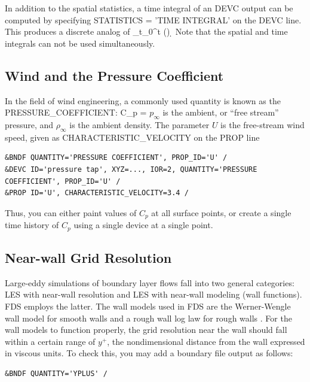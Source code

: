 \documentclass[11pt]{book}
\begin{document}
In addition to the spatial statistics, a time integral of an {\ct DEVC} output can be computed by specifying
{\ct STATISTICS = 'TIME INTEGRAL'} on the {\ct DEVC} line. This produces a discrete analog of
\be
 \int_{t_0}^t \phi(\tau) \; \d \tau
\ee
Note that the spatial and time integrals can not be used simultaneously.



\subsection{Wind and the Pressure Coefficient}
\label{info:wind}

In the field of wind engineering, a commonly used quantity is known as
the {\ct PRESSURE\_COEFFICIENT}:
\be
   C_p = 
\ee
$p_\infty$ is the ambient, or ``free stream'' pressure, and
$\rho_\infty$ is the ambient density.  The parameter $U$ is the
free-stream wind speed, given as {\ct CHARACTERISTIC\_VELOCITY} on the
{\ct PROP} line

\begin{lstlisting}
&BNDF QUANTITY='PRESSURE COEFFICIENT', PROP_ID='U' /
&DEVC ID='pressure tap', XYZ=..., IOR=2, QUANTITY='PRESSURE COEFFICIENT', PROP_ID='U' /
&PROP ID='U', CHARACTERISTIC_VELOCITY=3.4 /
\end{lstlisting}

\noindent
Thus, you can either paint values of $C_p$ at all surface points, or create a single time history of $C_p$ using a single device at a single point.

\subsection{Near-wall Grid Resolution}
\label{info:yplus}

Large-eddy simulations of boundary layer flows fall into two general categories: LES with near-wall resolution and LES with near-wall modeling (wall functions).  FDS employs the latter.  The wall models used in FDS are the Werner-Wengle wall model \cite{Werner:1991} for smooth walls and a rough wall log law for rough walls \cite{Pope:2000}.  For the wall models to function properly, the grid resolution near the wall should fall within a certain range of $y^+$, the nondimensional distance from the wall expressed in viscous units.  To check this, you may add a boundary file output as follows:

\begin{lstlisting}
&BNDF QUANTITY='YPLUS' /
\end{lstlisting}
\end{document}
